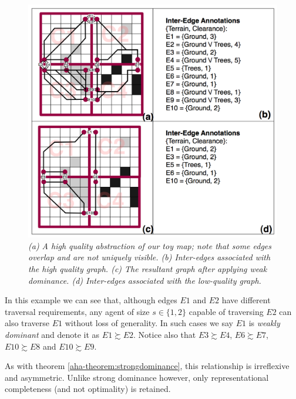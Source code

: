 \begin{figure}[htbp]
	\vspace{-9pt}
        \caption{\emph{(a) A high quality abstraction of our toy map; note that some edges overlap and are not uniquely visible. (b) Inter-edges associated with the high quality graph. (c) The resultant graph after applying weak dominance. (d) Inter-edges associated with the low-quality graph.}  \vspace{0.5em} }
        \begin{center}
                        \includegraphics[scale=0.25, trim = 20mm 12mm 20mm 0mm]{diagrams/abstraction_result.png}
        \end{center}
        \label{aha-fig:abstractgraph}
	\vspace{-10pt}
\end{figure}
In this example we can see that, although edges $E1$ and $E2$ have different traversal requirements, any agent of size $s \in \lbrace 1, 2 \rbrace$ capable of traversing $E2$ can also traverse $E1$ without loss of generality. 
In such cases we say $E1$ is \emph{weakly dominant} and denote it as $E1 \succsim E2$. 
Notice also that $E3 \succsim E4$, $E6 \succsim E7$, $E10 \succsim E8$ and $E10 \succsim E9$.
\par \indent
As with theorem \ref{aha-theorem:strongdominance}, this relationship is irreflexive and asymmetric.
Unlike strong dominance however, only representational completeness (and not optimality) is retained. 
